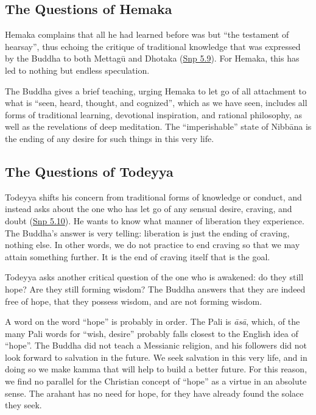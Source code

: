 \documentclass[12pt,openany]{book}%
\begin{document}
\subsection*{The Questions of Hemaka}

Hemaka complains that all he had learned before was but “the testament of hearsay”, thus echoing the critique of traditional knowledge that was expressed by the Buddha to both \textsanskrit{Mettagū} and Dhotaka (\href{https://suttacentral.net/snp5.9/en/sujato}{Snp 5.9}). For Hemaka, this has led to nothing but endless speculation.

The Buddha gives a brief teaching, urging Hemaka to let go of all attachment to what is “seen, heard, thought, and cognized”, which as we have seen, includes all forms of traditional learning, devotional inspiration, and rational philosophy, as well as the revelations of deep meditation. The “imperishable” state of \textsanskrit{Nibbāna} is the ending of any desire for such things in this very life.

\subsection*{The Questions of Todeyya}

Todeyya shifts his concern from traditional forms of knowledge or conduct, and instead asks about the one who has let go of any sensual desire, craving, and doubt (\href{https://suttacentral.net/snp5.10/en/sujato}{Snp 5.10}). He wants to know what manner of liberation they experience. The Buddha’s answer is very telling: liberation is just the ending of craving, nothing else. In other words, we do not practice to end craving so that we may attain something further. It is the end of craving itself that is the goal.

Todeyya asks another critical question of the one who is awakened: do they still hope? Are they still forming wisdom? The Buddha answers that they are indeed free of hope, that they possess wisdom, and are not forming wisdom.

A word on the word “hope” is probably in order. The Pali is \textit{\textsanskrit{āsā}}, which, of the many Pali words for “wish, desire” probably falls closest to the English idea of “hope”. The Buddha did not teach a Messianic religion, and his followers did not look forward to salvation in the future. We seek salvation in this very life, and in doing so we make kamma that will help to build a better future. For this reason, we find no parallel for the Christian concept of “hope” as a virtue in an absolute sense. The arahant has no need for hope, for they have already found the solace they seek.
\end{document}
